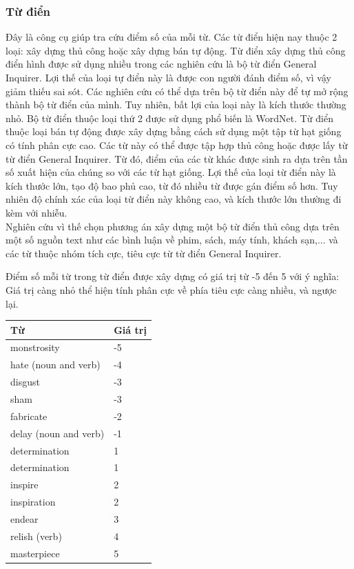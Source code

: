 \subsubsection*{Từ điển}
Đây là công cụ giúp tra cứu điểm số của mỗi từ. Các từ điển hiện nay thuộc 2 loại: xây dựng thủ công hoặc xây dựng bán tự động. Từ điển xây dựng thủ công điển hình được sử dụng nhiều trong các nghiên cứu là bộ từ điển General Inquirer. Lợi thế của loại tự điển này là được con người đánh điểm số, vì vậy giảm thiếu sai sót. Các nghiên cứu có thể dựa trên bộ từ điển này để tự mở rộng thành bộ từ điển của mình. Tuy nhiên, bất lợi của loại này là kích thước thường nhỏ. Bộ từ điển thuộc loại thứ 2 được sử dụng phổ biến là WordNet. Từ điển thuộc loại bán tự động được xây dựng bằng cách sử dụng một tập từ hạt giống có tính phân cực cao. Các từ này có thể được tập hợp thủ công hoặc được lấy từ từ điển General Inquirer. Từ đó, điểm của các từ khác được sinh ra dựa trên tần số xuất hiện của chúng so với các từ hạt giống. Lợi thế của loại từ điển này là kích thước lớn, tạo độ bao phủ cao, từ đó nhiều từ được gán điểm số hơn. Tuy nhiên độ chính xác của loại từ điển này không cao, và kích thước lớn thường đi kèm với nhiễu. \\

Nghiên cứu \cite{taboada2011lexicon} vì thế chọn phương án xây dựng một bộ từ điển thủ công dựa trên một số nguồn text như các bình luận về phim, sách, máy tính, khách sạn,... và các từ thuộc nhóm tích cực, tiêu cực từ từ điển General Inquirer. 

Điểm số mỗi từ trong từ điển được xây dựng có giá trị từ -5 đến 5 với ý nghĩa: Giá trị càng nhỏ thể hiện tính phân cực về phía tiêu cực càng nhiều, và ngược lại. 
\begin{table}[H]
\begin{tabular}{l l}
\hline
\textbf{Từ} & \textbf{Giá trị} 
\\ \hline
monstrosity & -5
\\ 
hate (noun and verb) & -4
\\ 
disgust & -3
\\ 
sham & -3
\\ 
fabricate & -2
\\ 
delay (noun and verb) & -1
\\
determination & 1
\\
determination & 1
\\ 
inspire & 2
\\ 
inspiration & 2
\\ 
endear & 3
\\ 
relish (verb) & 4
\\ 
masterpiece & 5
\\ \hline
\end{tabular}
\end{table}
